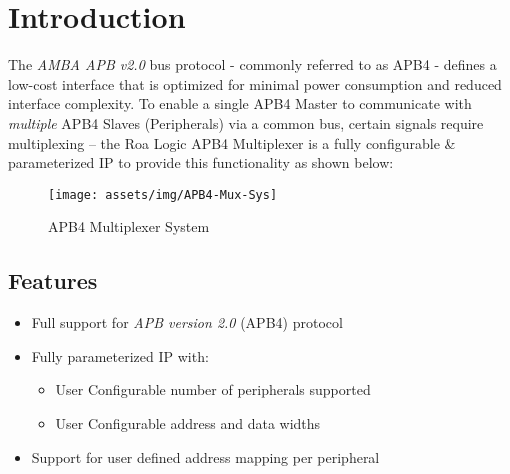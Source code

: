 \chapter{Introduction}\label{introduction}

The \emph{AMBA APB v2.0} bus protocol - commonly referred to as APB4 - 
defines a low-cost interface that is optimized for minimal power
consumption and reduced interface complexity. To enable a single APB4
Master to communicate with \emph{multiple} APB4 Slaves (Peripherals) via
a common bus, certain signals require multiplexing -- the Roa Logic APB4
Multiplexer is a fully configurable \& parameterized IP to provide this
functionality as shown below:

\begin{figure}[th]
	\centering
	\texttt{[image: assets/img/APB4-Mux-Sys]}
	\caption{APB4 Multiplexer System}
	\label{fig:apb4-mux-sys}
\end{figure}

\section{Features}\label{features}

\begin{itemize}
\item
  Full support for \emph{APB version 2.0} (APB4) protocol
\item
  Fully parameterized IP with:
  \begin{itemize}
  \item
    User Configurable number of peripherals supported
  \item
    User Configurable address and data widths
  \end{itemize}
\item
  Support for user defined address mapping per peripheral
\end{itemize}

